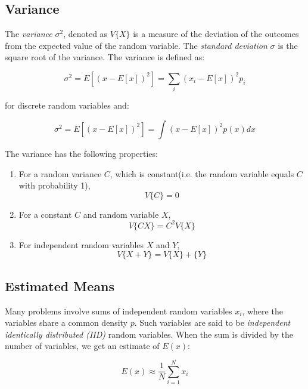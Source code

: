 \subsection{Variance}
The \textit{variance} $\sigma^2$, denoted as $V\{X\}$ is a measure of the deviation of the outcomes from the expected value of the random variable. The \textit{standard deviation} $\sigma$ is the square root of the variance. The variance is defined as:

\begin{equation}
	\sigma^2=E[(x-E[x])^2]=\sum_i (x_i-E[x])^2p_i
\end{equation}

for discrete random variables and:

\begin{equation}\label{e:discrete-variance}
	\sigma^2=E[(x-E[x])^2]=\int (x-E[x])^2 p(x)dx
\end{equation}

The variance has the following properties:
\begin{enumerate}
	\item For a random variance $C$, which is constant(i.e. the random variable equals $C$ with probability 1),
	\begin{equation}
		V\{C\}=0
	\end{equation}
	\item For a constant $C$ and random variable $X$,
	\begin{equation}
		V\{CX\}=C^2V\{X\}
	\end{equation}
	\item For independent random variables $X$ and $Y$,
	\begin{equation}
		V\{X+Y\}=V\{X\}+\{Y\}
	\end{equation}
\end{enumerate}


\subsection{Estimated Means}
Many problems involve sums of independent random variables $x_i$, where the variables share a common density $p$. Such variables are said to be \textit{independent identically distributed (IID)} random variables. When the sum is divided by the number of variables, we get an estimate of $E(x)$:

\begin{equation}
	E(x)\approx \frac{1}{N} \sum_{i=1}^{N}x_i
\end{equation}

